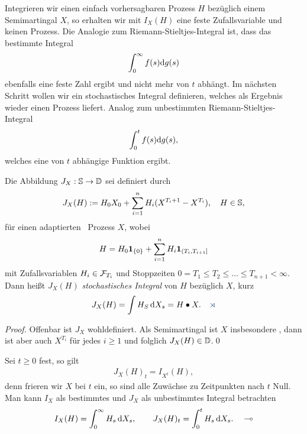 Integrieren wir einen einfach vorhersagbaren Prozess $H$ bezüglich einem
Semimartingal $X$, so erhalten wir mit $I_X(H)$ eine feste Zufallsvariable und
keinen Prozess. Die Analogie zum Riemann-Stieltjes-Integral ist, dass das
bestimmte Integral
\begin{align*}
\int_0^\infty f(s)\mathrm{d} g(s)
\end{align*}  
ebenfalls eine feste Zahl ergibt und nicht mehr von $t$ abhängt. Im nächsten
Schritt wollen wir ein stochastisches Integral definieren, welches als Ergebnis
wieder einen Prozess liefert. Analog zum unbestimmten Riemann-Stieltjes-Integral
\begin{align*}
\int_0^t f(s)\mathrm{d} g(s),
\end{align*}
welches eine von $t$ abhängige Funktion ergibt.

\begin{theorem}
\label{prop:2.8}
Die Abbildung $J_X:\mathbb{S}\to\mathbb{D}$ sei definiert durch
\begin{align*}
J_X(H):= H_0X_0 + \sum_{i=1}^n H_i(X^{T_i+1} - X^{T_i}), \quad H\in \mathbb{S},
\end{align*}
für einen adaptierten \cadlag\ Prozess $X$, wobei
\begin{align*}
H= H_0 \mathbf{1}_{\{0\}} + \sum_{i=1}^n H_i \mathbf{1}_{(T_i,T_{i+1}]}
\end{align*}
mit Zufallsvariablen $H_i \in \mathcal{F}_{T_i}$ und Stoppzeiten $0=T_1 \le T_2 \le
\ldots \le T_{n+1} < \infty $. Dann heißt $J_X(H)$ \emph{stochastisches
Integral} von $H$ bezüglich $X$, kurz
\begin{align*}
J_X(H) = \int H_S\dX_s = H \bullet X.\fish
\end{align*}
\end{theorem}
\begin{proof}
Offenbar ist $J_X$ wohldefiniert. Als Semimartingal ist $X$ insbesondere
\cadlag, dann ist aber auch $X^{T_i}$ für jedes $i\ge 1$ \cadlag und folglich
$J_X(H)\in \mathbb{D}$.\qed
\end{proof}

\begin{rem*}
Sei $t \ge 0$ fest, so gilt
\begin{align*}
J_X(H)_t = I_{X^t}(H),
\end{align*}
denn frieren wir $X$ bei $t$ ein, so sind alle Zuwächse zu Zeitpunkten nach $t$
Null. Man kann $I_X$ als bestimmtes und $J_X$ als unbestimmtes Integral
betrachten
\begin{align*}
I_X(H) = \int_0^\infty H_s \,\mathrm{d} X_s,\qquad
J_X(H)_t = \int_0^t H_s \,\mathrm{d} X_s.\quad\multimap
\end{align*}
\end{rem*}

